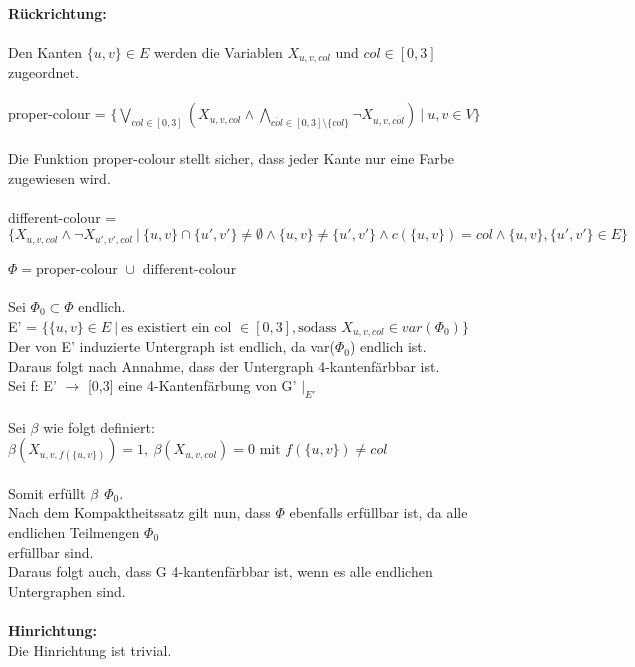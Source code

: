 \documentclass[a4paper,10pt]{article}
\begin{document}
	\ \\ \textbf{Rückrichtung:} \\
	\\
	Den Kanten $\{ u,v \} \in E$ werden die Variablen $X_{u,v,col}$ und $col \in [0,3]$ zugeordnet.\\
	\\
	proper-colour = 
	\( \{ \bigvee\limits_{col \in [0,3]} (X_{u,v,col} \wedge \bigwedge\limits_{\overline{col} \in [0,3]\setminus{ \{ col \} } } 
	\neg X_{u,v,\overline{col}})~|~u,v \in V \} \) \\	
	\\
	Die Funktion proper-colour stellt sicher, dass jeder Kante nur eine Farbe zugewiesen wird.\\
	\\
	different-colour = \\
	\( \{ X_{u,v,col} \wedge \neg X_{u',v',col}~|~
	\{ u,v \} \cap \{ u',v' \} \neq \emptyset \wedge 
	\{ u,v \} \neq \{ u',v' \} \wedge 
	c(\{ u,v \}) = col \wedge 
	\{u,v\},\{u',v'\} \in E \} \) \\
	\\	
	\(\Phi = \text{proper-colour } \cup \text{ different-colour} \)\\
	\\
	Sei $\Phi_0 \subset \Phi$ endlich.\\
	E' = $\{ \{u,v\} \in E~|~\text{es existiert ein col } \in [0,3], \text{sodass } X_{u,v,col} \in var(\Phi_0) \}$ \\
	Der von E' induzierte Untergraph ist endlich, da var($\Phi_0$) endlich ist.\\
	Daraus folgt nach Annahme, dass der Untergraph 4-kantenfärbbar ist.\\
	Sei f: E' $\rightarrow$ [0,3] eine 4-Kantenfärbung von G' $|_{E'}$\\
	\\
	Sei $\beta$ wie folgt definiert: \\
	\(\beta(X_{u,v,f(\{ u,v \})}) = 1,~\beta(X_{u,v,col}) = 0 \text{ mit } f(\{ u,v \}) \neq col \) \\
	\\
	Somit erfüllt $\beta~~\Phi_0$.\\
	Nach dem Kompaktheitssatz gilt nun, dass $\Phi$ ebenfalls erfüllbar ist, da alle endlichen Teilmengen $\Phi_0$\\
	erfüllbar sind.\\
	Daraus folgt auch, dass G 4-kantenfärbbar ist, wenn es alle endlichen Untergraphen sind.\\	
	
	\ \\ \textbf{Hinrichtung:} \\
	Die Hinrichtung ist trivial.
\end{document}
